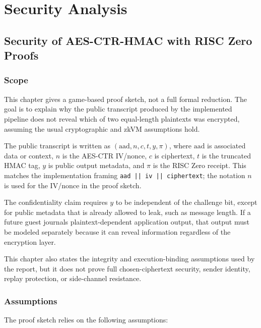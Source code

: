 \chapter{Security Analysis}

\section{Security of AES-CTR-HMAC with RISC Zero Proofs}

\subsection{Scope}

This chapter gives a game-based proof sketch, not a full formal reduction. The
goal is to explain why the public transcript produced by the implemented
pipeline does not reveal which of two equal-length plaintexts was encrypted,
assuming the usual cryptographic and zkVM assumptions hold.

The public transcript is written as
\((\mathrm{aad}, n, c, t, y, \pi)\), where \(\mathrm{aad}\) is associated data or
context, \(n\) is the AES-CTR IV/nonce, \(c\) is ciphertext, \(t\) is the
truncated HMAC tag, \(y\) is public output metadata, and \(\pi\) is the RISC Zero
receipt. This matches the implementation framing
\texttt{aad || iv || ciphertext}; the notation \(n\) is used for the IV/nonce in
the proof sketch.

The confidentiality claim requires \(y\) to be independent of the challenge bit,
except for public metadata that is already allowed to leak, such as message
length. If a future guest journals plaintext-dependent application output, that
output must be modeled separately because it can reveal information regardless of
the encryption layer.

This chapter also states the integrity and execution-binding assumptions used by
the report, but it does not prove full chosen-ciphertext security, sender
identity, replay protection, or side-channel resistance.

\subsection{Assumptions}

The proof sketch relies on the following assumptions:

